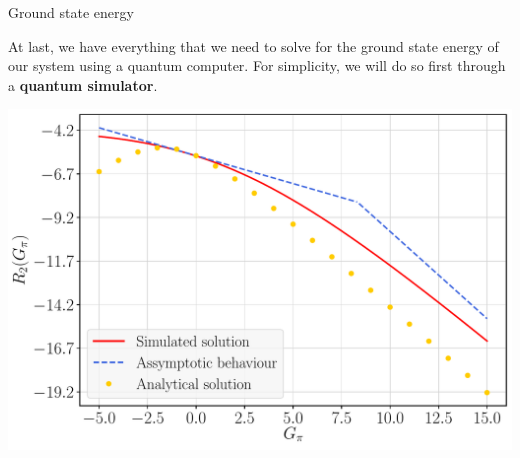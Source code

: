 \documentclass[9pt, handout, aspectratio=169]{beamer}	%
\begin{document}
\begin{frame}[allowframebreaks]{Ground state energy}

	At last, we have everything that we need to solve for the ground state energy of our system using a quantum computer. For simplicity, we will do so first through a \textbf{quantum simulator}.

	\begin{center}
		\includegraphics[width=.45\paperwidth]{Figures/NJL1-model-solving/G2}
	\end{center}
	\vspace{-2em}

\break


\end{frame}
\end{document}
